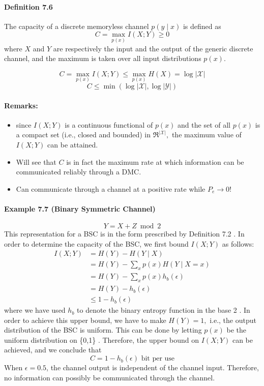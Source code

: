 \documentclass[8pt]{article}
\begin{document}
\begin{tcolorbox}
\paragraph{Definition 7.6} The capacity of a discrete memoryless channel $p(y \mid x)$ is defined
as
$$
C=\max _{p(x)} I(X ; Y) \geq 0
$$
where $X$ and $Y$ are respectively the input and the output of the generic discrete channel, and the maximum is taken over all input distributions $p(x)$.
\end{tcolorbox}
$$
C=\max _{p(x)} I(X ; Y) \leq \max _{p(x)} H(X)=\log |\mathcal{X}|
$$
$$
C \leq \min (\log |\mathcal{X}|, \log |\mathcal{Y}|)
$$
\paragraph{Remarks:}
\begin{itemize}
	\item since $I(X ; Y)$ is a continuous functional of $p(x)$ and the set of all $p(x)$ is a compact set (i.e., closed and bounded) in $\Re^{|\mathcal{X}|},$ the maximum value of $I(X ; Y)$ can be attained.
	\item Will see that $C$ is in fact the maximum rate at which information can be communicated reliably through a DMC.
	\item Can communicate through a channel at a positive rate while $P_{e} \rightarrow 0 !$
\end{itemize}

\paragraph{Example 7.7 (Binary Symmetric Channel)}
$$
Y=X+Z \bmod 2
$$
This representation for a BSC is in the form prescribed by Definition 7.2 . In order to determine the capacity of the BSC, we first bound $I(X ; Y)$ as follows:
$$
\begin{aligned}
I(X ; Y) &=H(Y)-H(Y \mid X) \\
&=H(Y)-\sum_{x} p(x) H(Y \mid X=x) \\
&=H(Y)-\sum_{x} p(x) h_{b}(\epsilon) \\
&=H(Y)-h_{b}(\epsilon) \\
& \leq 1-h_{b}(\epsilon)
\end{aligned}
$$
where we have used $h_{b}$ to denote the binary entropy function in the base 2 . In order to achieve this upper bound, we have to make $H(Y)=1,$ i.e., the output distribution of the BSC is uniform. This can be done by letting $p(x)$ be the uniform distribution on \{0,1\} . Therefore, the upper bound on $I(X ; Y)$ can be achieved, and we conclude that
$$C=1-h_{b}(\epsilon) \text{ bit per use} $$
When $\epsilon = 0.5$, the channel output is independent of the channel input.
Therefore, no information can possibly be communicated through the channel.
\end{document}
